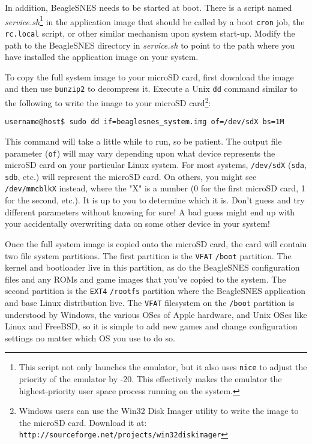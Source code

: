 In addition, BeagleSNES needs to be started at boot. There is a script named \emph{service.sh}\footnote{This script not only launches the emulator, but it also uses \texttt{nice} to adjust the priority of the emulator by -20. This effectively makes the emulator the highest-priority user space process running on the system.} in the application image that should be called by a boot \texttt{cron} job, the \texttt{rc.local} script, or other similar mechanism upon system start-up. Modify the path to the BeagleSNES directory in \emph{service.sh} to point to the path where you have installed the application image on your system.

To copy the full system image to your microSD card, first download the image and then use \texttt{bunzip2} to decompress it.  Execute a Unix \texttt{dd} command similar to the following to write the image to your microSD card\footnote{Windows users can use the Win32 Disk Imager utility to write the image to the microSD card.  Download it at: \texttt{http://sourceforge.net/projects/win32diskimager}}:

\begin{commandBox}
\texttt{username@host\$ sudo dd if=beaglesnes\_system.img of=/dev/sdX bs=1M}
\end{commandBox}

This command will take a little while to run, so be patient. The output file parameter (\texttt{of}) will may vary depending upon what device represents the microSD card on your particular Linux system. For most systems, \texttt{/dev/sdX} (\texttt{sda}, \texttt{sdb}, etc.) will represent the microSD card. On others, you might see \texttt{/dev/mmcblkX} instead, where the "X" is a number (0 for the first microSD card, 1 for the second, etc.). It is up to you to determine which it is. Don't guess and try different parameters without knowing for sure! A bad guess might end up with your accidentally overwriting data on some other device in your system!

Once the full system image is copied onto the microSD card, the card will contain two file system partitions.  The first partition is the \texttt{VFAT} \texttt{/boot} partition.  The kernel and bootloader live in this partition, as do the BeagleSNES configuration files and any ROMs and game images that you've copied to the system.  The second partition is the \texttt{EXT4} \texttt{/rootfs} partition where the BeagleSNES application and base Linux distribution live.  The \texttt{VFAT} filesystem on the \texttt{/boot} partition is understood by Windows, the various OSes of Apple hardware, and Unix OSes like Linux and FreeBSD, so it is simple to add new games and change configuration settings no matter which OS you use to do so.  

